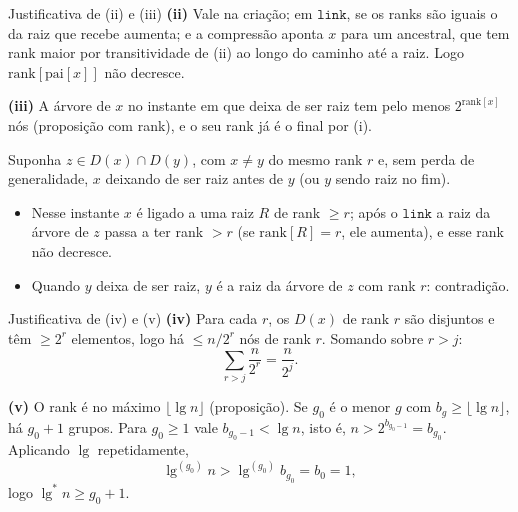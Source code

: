 \documentclass[aspectratio=169,10pt]{beamer}
\newcommand{\Link}{\mathtt{link}}
\renewcommand{\lg}{\operatorname{lg}}
\newcommand{\lgs}{\lg^{*}}
\begin{document}
\begin{frame}[t]{Justificativa de (ii) e (iii)}
  \footnotesize
  \textbf{(ii)} Vale na criação; em $\Link$, se os ranks são iguais o da
  raiz que recebe aumenta; e a compressão aponta $x$ para um ancestral, que
  tem rank maior por transitividade de (ii) ao longo do caminho até a
  raiz.  Logo $\mathrm{rank}[\mathrm{pai}[x]]$ não decresce.

  \medskip
  \textbf{(iii)} A árvore de $x$ no instante em que deixa de ser raiz
  tem pelo menos $2^{\mathrm{rank}[x]}$ nós (proposição com rank), e o
  seu rank já é o final por (i).

  Suponha $z\in D(x)\cap D(y)$, com $x\neq y$ do mesmo rank $r$ e, sem
  perda de generalidade, $x$ deixando de ser raiz antes de $y$ (ou $y$
  sendo raiz no fim).
  \begin{itemize}
  \item Nesse instante $x$ é ligado a uma raiz $R$ de rank $\geq r$;
    após o $\Link$ a raiz da árvore de $z$ passa a ter rank $>r$ (se
    $\mathrm{rank}[R]=r$, ele aumenta), e esse rank não decresce.
  \item Quando $y$ deixa de ser raiz, $y$ é a raiz da árvore de $z$ com
    rank $r$: contradição.
  \end{itemize}
\end{frame}

\begin{frame}[t]{Justificativa de (iv) e (v)}
  \footnotesize
  \textbf{(iv)} Para cada $r$, os $D(x)$ de rank $r$ são disjuntos e têm
  $\geq2^r$ elementos, logo há $\leq n/2^r$ nós de rank $r$.  Somando
  sobre $r>j$:
  \[
    \sum_{r>j}\frac{n}{2^r}=\frac{n}{2^j}.
  \]

  \medskip
  \textbf{(v)} O rank é no máximo $\lfloor\lg n\rfloor$ (proposição).
  Se $g_0$ é o menor $g$ com $b_g\geq\lfloor\lg n\rfloor$, há $g_0+1$
  grupos.  Para $g_0\geq1$ vale $b_{g_0-1}<\lg n$, isto é,
  $n>2^{b_{g_0-1}}=b_{g_0}$.  Aplicando $\lg$ repetidamente,
  \[
    \lg^{(g_0)}n>\lg^{(g_0)}b_{g_0}=b_0=1,
  \]
  logo $\lgs n\geq g_0+1$.
\end{frame}
\end{document}
